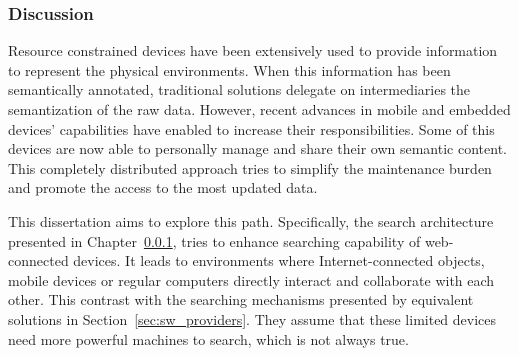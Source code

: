 \subsubsection{Discussion}

Resource constrained devices have been extensively used to provide information to represent the physical environments.
When this information has been semantically annotated, traditional solutions delegate on intermediaries the semantization of the raw data.
However, recent advances in mobile and embedded devices' capabilities have enabled to increase their responsibilities.
Some of this devices are now able to personally manage and share their own semantic content.
This completely distributed approach tries to simplify the maintenance burden and promote the access to the most updated data.


This dissertation aims to explore this path.
Specifically, the search architecture presented in Chapter~\ref{}, tries to enhance searching capability of web-connected devices.
It leads to environments where Internet-connected objects, mobile devices or regular computers directly interact and collaborate with each other. %
This contrast with the searching mechanisms presented by equivalent solutions in Section~\ref{sec:sw_providers}.
They assume that these limited devices need more powerful machines to search, which is not always true. %